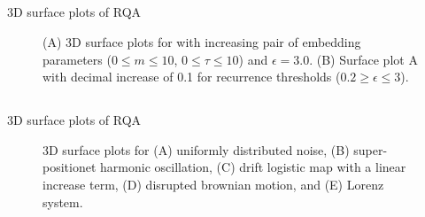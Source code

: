 \subsection{}
{

\begin{frame}{3D surface plots of RQA}

    \begin{figure}
	\caption{(A) 3D surface plots for 
	with increasing pair of embedding parameters 
	($0 \le m \le 10$, $0 \le \tau \le 10$) and $\epsilon=3.0$.
	(B) Surface plot A with decimal increase of 0.1 
	for recurrence thresholds ($ 0.2 \ge \epsilon \le 3 $).
	} 
   \end{figure}
		
\end{frame}
}



\subsection{}
{

\begin{frame}{3D surface plots of RQA}

    \begin{figure}
	\caption{3D surface plots for 
		(A) uniformly distributed noise,
		(B) super-positionet harmonic oscillation,
		(C) drift logistic map with a linear increase term,
		(D) disrupted brownian motion, and
		(E) Lorenz system.
		} 
   \end{figure}
		
\end{frame}
}





